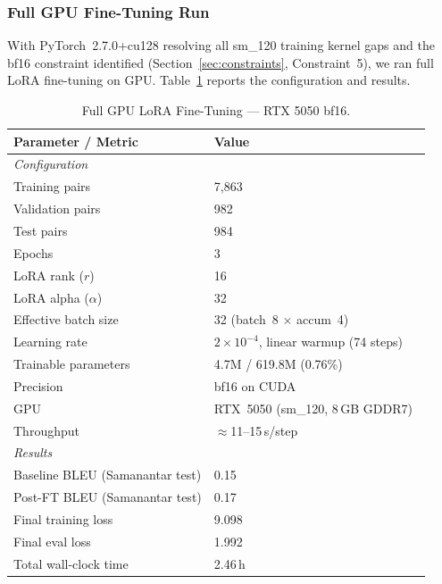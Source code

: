 \documentclass[conference]{IEEEtran}
\newcommand{\POSTFTBLEU}{0.17}
\newcommand{\TRAINLOSS}{9.098}
\newcommand{\TRAINDURATION}{2.46\,h}
\newcommand{\EVALLOSSFINAL}{1.992}
\begin{document}
\subsubsection{Full GPU Fine-Tuning Run}

With PyTorch~2.7.0+cu128 resolving all sm\_120 training kernel gaps and the bf16
constraint identified (Section~\ref{sec:constraints}, Constraint~5), we ran full
LoRA fine-tuning on GPU. Table~\ref{tab:finetune_gpu} reports the configuration
and results.

\begin{table}[htbp]
\caption{Full GPU LoRA Fine-Tuning --- RTX 5050 bf16.}
\label{tab:finetune_gpu}
\centering
\small
\begin{tabular}{p{}p{}}
\toprule
Parameter / Metric & Value \\
\midrule
\multicolumn{2}{l}{\textit{Configuration}} \\
Training pairs & 7,863 \\
Validation pairs & 982 \\
Test pairs & 984 \\
Epochs & 3 \\
LoRA rank ($r$) & 16 \\
LoRA alpha ($\alpha$) & 32 \\
Effective batch size & 32 (batch~8 $\times$ accum~4) \\
Learning rate & $2{\times}10^{-4}$, linear warmup (74 steps) \\
Trainable parameters & 4.7M / 619.8M (0.76\%) \\
Precision & bf16 on CUDA~\cite{micikevicius2018mixed} \\
GPU & RTX~5050 (sm\_120, 8\,GB GDDR7)~\cite{nvidia_blackwell} \\
Throughput & $\approx$11--15\,s/step \\
\midrule
\multicolumn{2}{l}{\textit{Results}} \\
Baseline BLEU (Samanantar test) & 0.15 \\
Post-FT BLEU (Samanantar test) & \POSTFTBLEU \\
Final training loss & \TRAINLOSS \\
Final eval loss & \EVALLOSSFINAL \\
Total wall-clock time & \TRAINDURATION \\
\bottomrule
\end{tabular}
\end{table}
\end{document}
